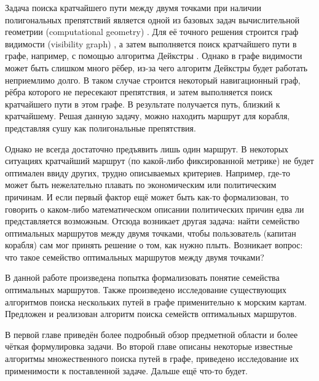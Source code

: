 \startprefacepage

Задача поиска кратчайшего пути между двумя точками при наличии
полигональных препятствий является одной из базовых задач
вычислительной геометрии (computational
geometry) \cite{PrSh}. Для её точного решения строится граф
видимости (visibility graph) \cite{deBerg}, а затем выполняется поиск
кратчайшего пути в графе, например, с помощью алгоритма Дейкстры
\cite{Cormen}. Однако в графе видимости может быть слишком много
рёбер, из-за чего алгоритм Дейкстры будет работать неприемлимо долго.
В таком случае строится некоторый навигационный граф, рёбра которого
не пересекают препятствия, и затем выполняется поиск кратчайшего пути
в этом графе. В результате получается путь, близкий к кратчайшему.
Решая данную задачу, можно находить маршрут для корабля, представляя
сушу как полигональные препятствия. 

Однако не всегда достаточно предъявить лишь один маршрут. В некоторых
ситуациях кратчайший маршрут (по какой-либо фиксированной метрике) не
будет оптимален ввиду других, трудно описываемых критериев. Например,
где-то может быть нежелательно плавать по экономическим или
политическим причинам. И если первый фактор ещё может быть как-то
формализован, то говорить о каком-либо математическом
описании политических причин едва ли представляется возможным. Отсюда
возникает другая задача: найти семейство оптимальных маршрутов между
двумя точками, чтобы пользователь (капитан корабля) сам мог принять
решение о том, как нужно плыть. Возникает вопрос: что такое семейство
оптимальных маршрутов между двумя точками?

В данной работе произведена попытка формализовать понятие семейства
оптимальных маршрутов. Также произведено исследование существующих
алгоритмов поиска нескольких путей в графе применительно к морским
картам. Предложен и реализован алгоритм поиска семейств оптимальных маршрутов.

В первой главе приведён более подробный обзор предметной области и
более чёткая формулировка задачи. Во второй главе описаны некоторые
известные алгоритмы множественного поиска путей в графе, приведено
исследование их применимости к поставленной задаче. Дальше ещё что-то будет.

\FloatBarrier

